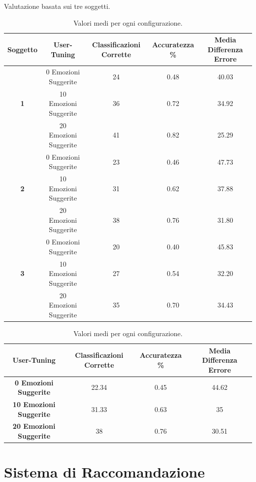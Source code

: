\documentclass[11pt]{report}
\begin{document}
\begin{table}
\caption{Valutazione basata sui tre soggetti.}
\label{tab3}
\begin{tabular}{|c|c|c|c|c|}
\hline
 \textbf{Soggetto} & \textbf{User-Tuning} &  \textbf{Classificazioni Corrette} & \textbf{Accuratezza \%}  & \textbf{Media Differenza Errore}\\
\hline
&0 Emozioni Suggerite &  24  & 0.48 & 40.03\\
 \textbf{1}&10 Emozioni Suggerite &  36   & 0.72 & 34.92 \\
&20 Emozioni Suggerite &  41   & 0.82 & 25.29\\
\hline
&0 Emozioni Suggerite &  23  & 0.46 & 47.73\\
 \textbf{2}&10 Emozioni Suggerite &  31  & 0.62 & 37.88\\
&20 Emozioni Suggerite &  38  & 0.76 & 31.80\\
\hline
&0 Emozioni Suggerite &  20  & 0.40 & 45.83\\
 \textbf{3}&10 Emozioni Suggerite &  27  & 0.54 & 32.20\\
&20 Emozioni Suggerite &  35  & 0.70 & 34.43\\

\hline
\end{tabular}

\vspace{1cm}

\caption{Valori medi per ogni configurazione.}
\label{tab4}

\begin{tabular}{|c|c|c|c|}
\hline
\textbf{User-Tuning} &  \textbf{Classificazioni Corrette} & \textbf{Accuratezza \%}  & \textbf{Media Differenza Errore}\\
\hline
\textbf{0 Emozioni Suggerite} &  22.34  & 0.45 & 44.62\\
\hline
\textbf{10 Emozioni Suggerite} &  31.33  & 0.63 & 35\\
\hline
\textbf{20 Emozioni Suggerite} &  38  & 0.76 & 30.51\\
\hline
\hline
\end{tabular}
\end{table}



\chapter{Sistema di Raccomandazione}
\end{document}
